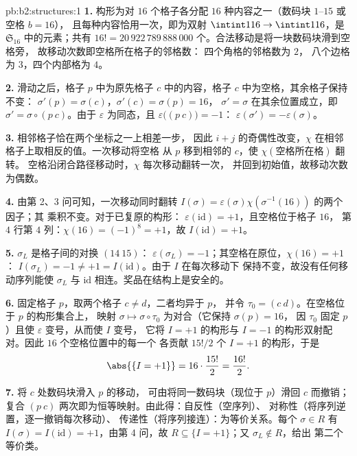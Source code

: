 \begin{solution}{pb:b2:structures:1}
\textbf{1.} 构形为对 $16$ 个格子各分配
$16$ 种内容之一（数码块 $1$--$15$ 或空格 $b = 16$），
且每种内容恰用一次，即为双射 $\intint1{16} \to
\intint1{16}$，是 $\mathfrak{S}_{16}$ 中的元素；共有 $16!
= 20\,922\,789\,888\,000$ 个。合法移动是将一块数码块滑到空格旁，
故移动次数即空格所在格子的邻格数：
四个角格的邻格数为 $2$，
八个边格为 $3$，四个内部格为 $4$。

\textbf{2.} 滑动之后，格子 $p$ 中为原先格子
$c$ 中的内容，格子 $c$ 中为空格，其余格子保持不变：
$\sigma'(p) = \sigma(c)$，$\sigma'(c) = \sigma(p) = 16$，
$\sigma' = \sigma$ 在其余位置成立，即 $\sigma' = \sigma
\circ (p\ c)$。由于 $\varepsilon$ 为同态，且
$\varepsilon\bigl((p\ c)\bigr) = -1$：
$\varepsilon(\sigma') = -\varepsilon(\sigma)$。

\textbf{3.} 相邻格子恰在两个坐标之一上相差一步，
因此 $i + j$ 的奇偶性改变，$\chi$
在相邻格子上取相反的值。一次移动将空格
从 $p$ 移到相邻的 $c$，使 $\chi(\text{空格所在格})$ 翻转。
空格沿闭合路径移动时，$\chi$ 每次移动翻转一次，
并回到初始值，故移动次数为偶数。

\textbf{4.} 由第 2、3 问可知，一次移动同时翻转
$I(\sigma) = \varepsilon(\sigma)\chi(\sigma^{-1}(16))$ 的两个因子；其
乘积不变。对于已复原的构形：
$\varepsilon(\mathrm{id}) = +1$，且空格位于格子 $16$，
第 $4$ 行第 $4$ 列：$\chi(16) = (-1)^{8} = +1$，故
$I(\mathrm{id}) = +1$。

\textbf{5.} $\sigma_L$ 是格子间的对换 $(14\ 15)$：
$\varepsilon(\sigma_L) = -1$；其空格在原位，$\chi(16) = +1$：
$I(\sigma_L) = -1 \neq +1 = I(\mathrm{id})$。由于 $I$ 在每次移动下
保持不变，故没有任何移动序列能使 $\sigma_L$
与 $\mathrm{id}$ 相连。奖品在结构上是安全的。

\textbf{6.} 固定格子 $p$，取两个格子 $c \neq d$，二者均异于 $p$，
并令 $\tau_0 = (c\ d)$。在空格位于 $p$ 的构形集合上，
映射 $\sigma \mapsto \sigma
\circ \tau_0$ 为对合（它保持 $\sigma(p) = 16$，
因 $\tau_0$ 固定 $p$）且使 $\varepsilon$ 变号，从而使 $I$ 变号，
它将 $I = +1$ 的构形与
$I = -1$ 的构形双射配对。因此 $16$ 个空格位置中的每一个
各贡献 $15!/2$ 个 $I = +1$ 的构形，于是
\[
\abs{\{I = +1\}} = 16 \cdot \frac{15!}{2} = \frac{16!}{2}.
\]

\textbf{7.} 将 $c$ 处数码块滑入 $p$ 的移动，
可由将同一数码块（现位于 $p$）滑回 $c$ 而撤销；复合
$(p\ c)$ 两次即为恒等映射。由此得：自反性（空序列）、
对称性（将序列逆置，逐一撤销每次移动）、
传递性（将序列接连）：为等价关系。每个
$\sigma \in R$ 有 $I(\sigma) = I(\mathrm{id}) = +1$，由第 
4 问，故 $R \subseteq \{I = +1\}$；又 $\sigma_L \notin R$，给出
第二个等价类。


\end{solution}
